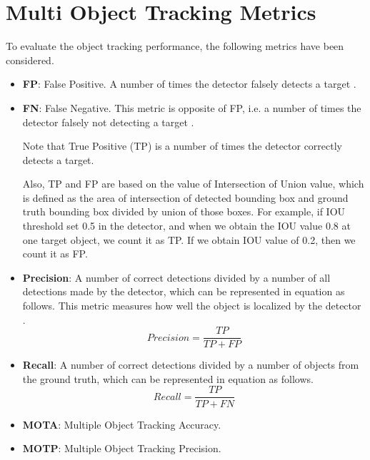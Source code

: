\section{Multi Object Tracking Metrics}
\label{sec:background/section_c}

To evaluate the object tracking performance, the following metrics have been considered.


\begin{itemize}


\item \textbf{FP}: False Positive. A number of times the detector falsely detects a target \cite{ristani_performance_2016}.

\item \textbf{FN}: False Negative. This metric is opposite of FP, i.e. a number of times the detector falsely not detecting a target \cite{ristani_performance_2016}.

Note that True Positive (TP) is a number of times the detector correctly detects a target.

Also, TP and FP are based on the value of Intersection of Union value, which is defined as the area of intersection of detected bounding box and ground truth bounding box divided by union of those boxes. For example, if IOU threshold set 0.5 in the detector, and when we obtain the IOU value 0.8 at one target object, we count it as TP. If we obtain IOU value of 0.2, then we count it as FP.

\item \textbf{Precision}: A number of correct detections divided by a number of all detections made by the detector, which can be represented in equation as follows. This metric measures how well the object is localized by the detector \cite{ristani_performance_2016} \cite{milan_mot16_2016}.
\begin{equation}
Precision = \frac{TP}{TP + FP}
\end{equation}

\item \textbf{Recall}: A number of correct detections divided by a number of objects from the ground truth, which can be represented in equation as follows.
\begin{equation}
Recall = \frac{TP}{TP + FN}
\end{equation}

\item \textbf{MOTA}: Multiple Object Tracking Accuracy. 

\item \textbf{MOTP}: Multiple Object Tracking Precision.



\end{itemize}

